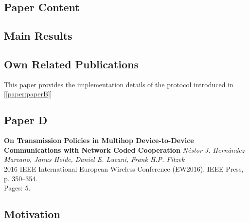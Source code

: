  \subsection*{Paper Content}
\subsection*{Main Results}
\subsection*{Own Related Publications}
This paper provides the implementation details of the protocol introduced in [\ref{paper:paperB}]
\clearpage


\subsection{Paper D}
\textbf{On Transmission Policies in Multihop Device-to-Device Communications
with Network Coded Cooperation}
\textit{N\'estor J. Hern\'andez Marcano, Janus Heide, Daniel E. Lucani, Frank H.P. Fitzek}
\\  2016 IEEE International European Wireless Conference (EW2016). IEEE Press, p. 350--354.
\\ Pages: 5.
\subsection*{Motivation}

